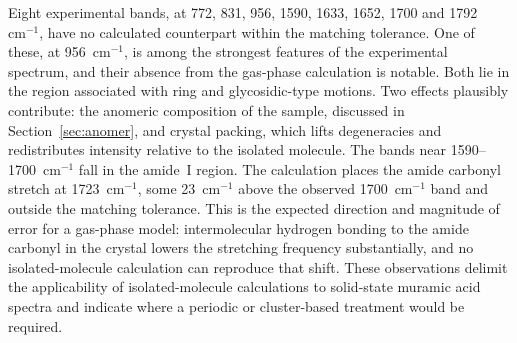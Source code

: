 \documentclass[11pt,a4paper]{article}
\newcommand{\wn}{\ensuremath{\mathrm{cm}^{-1}}}
\begin{document}
Eight experimental bands, at 772, 831, 956, 1590, 1633, 1652, 1700 and
1792~\wn{}, have no calculated counterpart within the matching tolerance. One of these,
at 956~\wn{}, is among the strongest features of the experimental spectrum, and their absence from the gas-phase calculation is notable. Both lie in the region
associated with ring and glycosidic-type motions. Two effects plausibly
contribute: the anomeric composition of the sample, discussed in
Section~\ref{sec:anomer}, and crystal packing, which lifts degeneracies and
redistributes intensity relative to the isolated molecule. The bands near 1590--1700~\wn{} fall in the
amide~I region. The calculation places the amide carbonyl stretch at
1723~\wn{}, some 23~\wn{} above the observed 1700~\wn{} band and outside the
matching tolerance. This is the expected direction and magnitude of error for a
gas-phase model: intermolecular hydrogen bonding to the amide carbonyl in the
crystal lowers the stretching frequency substantially, and no isolated-molecule
calculation can reproduce that shift. These
observations delimit the applicability of isolated-molecule calculations to
solid-state muramic acid spectra and indicate where a periodic or
cluster-based treatment would be required.
\end{document}
